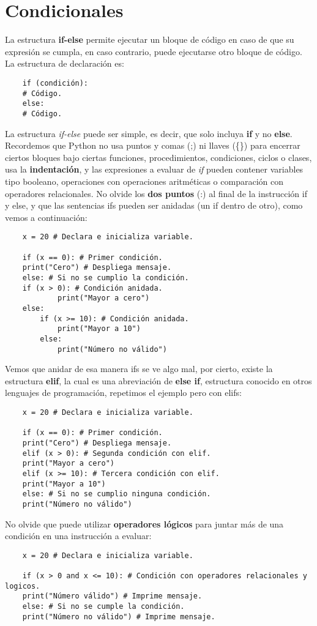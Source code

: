 \section{Condicionales}

La estructura \textbf{if-else} permite ejecutar un bloque de código en caso de que su expresión se cumpla, en caso contrario, puede ejecutarse otro bloque de código. La estructura de declaración es:
\begin{lstlisting}
    if (condición):
	# Código.
    else:
	# Código.
\end{lstlisting}

La estructura \textit{if-else} puede ser simple, es decir, que solo incluya \textbf{if} y no \textbf{else}. Recordemos que Python no usa puntos y comas (;) ni llaves (\{\}) para encerrar ciertos bloques bajo ciertas funciones, procedimientos, condiciones, ciclos o clases, usa la \textbf{indentación}, y las expresiones a evaluar de \textit{if} pueden contener variables tipo booleano, operaciones con operaciones aritméticas o comparación con operadores relacionales. No olvide los \textbf{dos puntos} (:) al final de la instrucción if y else, y que las sentencias ifs pueden ser anidadas (un if dentro de otro), como vemos a continuación:
\begin{lstlisting}
    x = 20 # Declara e inicializa variable.

    if (x == 0): # Primer condición.
	print("Cero") # Despliega mensaje.
    else: # Si no se cumplio la condición.
	if (x > 0): # Condición anidada.
            print("Mayor a cero")
	else:
		if (x >= 10): # Condición anidada.
			print("Mayor a 10")
		else:
			print("Número no válido")
\end{lstlisting}

Vemos que anidar de esa manera ifs se ve algo mal, por cierto, existe la estructura \textbf{elif}, la cual es una abreviación de \textbf{else if}, estructura conocido en otros lenguajes de programación, repetimos el ejemplo pero con elifs:
\begin{lstlisting}
    x = 20 # Declara e inicializa variable.

    if (x == 0): # Primer condición.
	print("Cero") # Despliega mensaje.
    elif (x > 0): # Segunda condición con elif.
	print("Mayor a cero")
    elif (x >= 10): # Tercera condición con elif.
	print("Mayor a 10")
    else: # Si no se cumplio ninguna condición.
	print("Número no válido")
\end{lstlisting}

No olvide que puede utilizar \textbf{operadores lógicos} para juntar más de una condición en una instrucción a evaluar:
\begin{lstlisting}
    x = 20 # Declara e inicializa variable.

    if (x > 0 and x <= 10): # Condición con operadores relacionales y logicos.
	print("Número válido") # Imprime mensaje.
    else: # Si no se cumple la condición.
	print("Número no válido") # Imprime mensaje.
\end{lstlisting}

